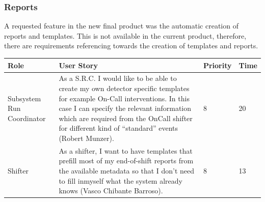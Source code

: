 \documentclass[paper=a4, fontsize=11pt,twoside]{scrartcl}	%
\begin{document}
\subsubsection{Reports}
A requested feature in the new final product was the automatic creation of reports and templates. This is not available in the current product, therefore, there are requirements referencing towards the creation of templates and reports.
\begin{longtable}{| p{3cm} | p{8cm} | p{1.5cm} | l |}
\hline
Role & User Story & Priority & Time \\ \hline
Subsystem Run Coordinator & As a S.R.C. I would like to be able to create my own detector specific templates for example On-Call interventions. In this case I can specify the relevant information which are required from the OnCall shifter for different kind of “standard” events (Robert Munzer). & 8 & 20 \\ \hline
Shifter &  As a shifter, I want to have templates that prefill most of my end-of-shift reports from the available metadata so that I don’t need to fill inmyself what the system already knows (Vasco Chibante Barroso). & 8 & 13 \\ \hline
\end{longtable}
\end{document}
